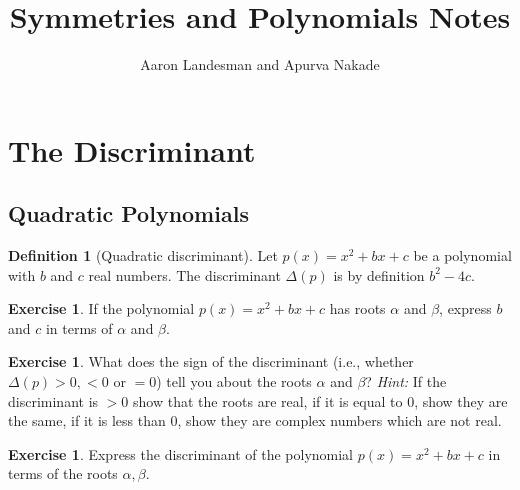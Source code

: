 \documentclass[reqno, 12pt, letter]{article}
\title{Symmetries and Polynomials Notes}
\author{Aaron Landesman and Apurva Nakade}
\theoremstyle{plain}
\theoremstyle{definition}
\newtheorem{definition}[theorem]{Definition}
\newtheorem{exercise}[theorem]{Exercise}
\theoremstyle{remark}
\numberwithin{equation}{section}
\begin{document}
\maketitle
{}

\section{The Discriminant}

\subsection{Quadratic Polynomials}
\begin{definition}[Quadratic discriminant]
	\label{definition:quadratic-discriminant}
	Let $p(x) = x^2 + bx + c$ be a polynomial with $b$ and $c$ real numbers.
	The discriminant $\Delta(p)$ is by definition $b^2 - 4c$.
\end{definition}
\begin{exercise}
	\label{exercise:}
	If the polynomial $p(x) = x^2 + bx + c$ has roots $\alpha$ and $\beta$, express $b$ and $c$
	in terms of $\alpha$ and $\beta$.
\end{exercise}
\begin{exercise}
	\label{exercise:quadratic-roots}
	What does the sign of the discriminant (i.e., whether $\Delta(p) > 0, < 0$ or $=0$) 
	tell you about the roots $\alpha$ and $\beta$?
	{\it Hint:} If the discriminant is $>0$ show that the roots are real, if it is equal
	to $0$, show they are the same, if it is less than $0$, show they are complex numbers
	which are not real.
\end{exercise}
\begin{exercise}
	\label{exercise:quadratic-discriminant-in-roots}
	Express the discriminant of the polynomial $p(x) = x^2 + bx + c$ in terms of
	the roots $\alpha, \beta$.
\end{exercise}
\end{document}
